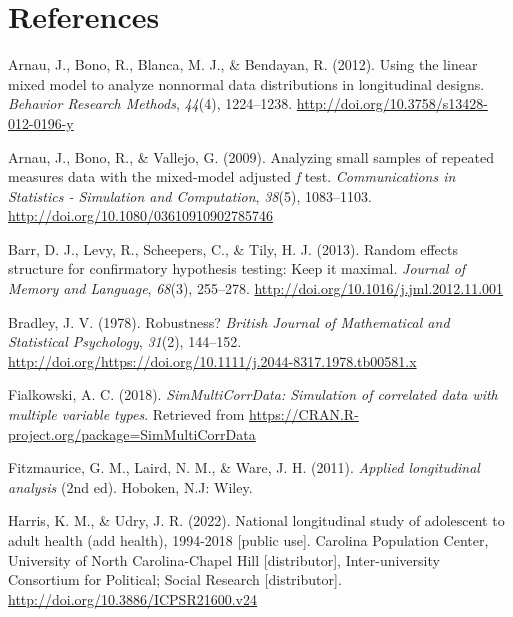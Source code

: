 \documentclass[12pt, twoside]{amherstthesis}
\begin{document}
\backmatter

\hypertarget{references}{%
\chapter*{References}\label{references}}

\noindent

\setlength{\parindent}{-0.20in}
\setlength{\leftskip}{0.20in}
\setlength{\parskip}{8pt}

\hypertarget{refs}{}
\leavevmode\hypertarget{ref-arnau_using_2012}{}%
Arnau, J., Bono, R., Blanca, M. J., \& Bendayan, R. (2012). Using the linear mixed model to analyze nonnormal data distributions in longitudinal designs. \emph{Behavior Research Methods}, \emph{44}(4), 1224--1238. \url{http://doi.org/10.3758/s13428-012-0196-y}

\leavevmode\hypertarget{ref-arnau_analyzing_2009}{}%
Arnau, J., Bono, R., \& Vallejo, G. (2009). Analyzing small samples of repeated measures data with the mixed-model adjusted \emph{f} test. \emph{Communications in Statistics - Simulation and Computation}, \emph{38}(5), 1083--1103. \url{http://doi.org/10.1080/03610910902785746}

\leavevmode\hypertarget{ref-barr_random_2013}{}%
Barr, D. J., Levy, R., Scheepers, C., \& Tily, H. J. (2013). Random effects structure for confirmatory hypothesis testing: Keep it maximal. \emph{Journal of Memory and Language}, \emph{68}(3), 255--278. \url{http://doi.org/10.1016/j.jml.2012.11.001}

\leavevmode\hypertarget{ref-bradley}{}%
Bradley, J. V. (1978). Robustness? \emph{British Journal of Mathematical and Statistical Psychology}, \emph{31}(2), 144--152. \url{http://doi.org/https://doi.org/10.1111/j.2044-8317.1978.tb00581.x}

\leavevmode\hypertarget{ref-Simtest}{}%
Fialkowski, A. C. (2018). \emph{SimMultiCorrData: Simulation of correlated data with multiple variable types}. Retrieved from \url{https://CRAN.R-project.org/package=SimMultiCorrData}

\leavevmode\hypertarget{ref-fitzmaurice_applied_2011}{}%
Fitzmaurice, G. M., Laird, N. M., \& Ware, J. H. (2011). \emph{Applied longitudinal analysis} (2nd ed). Hoboken, N.J: Wiley.

\leavevmode\hypertarget{ref-harris_national_2022}{}%
Harris, K. M., \& Udry, J. R. (2022). National longitudinal study of adolescent to adult health (add health), 1994-2018 {[}public use{]}. Carolina Population Center, University of North Carolina-Chapel Hill {[}distributor{]}, Inter-university Consortium for Political; Social Research {[}distributor{]}. \url{http://doi.org/10.3886/ICPSR21600.v24}
\end{document}
